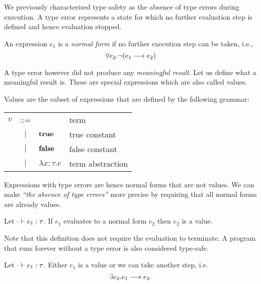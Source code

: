 {We previously characterized type safety as the absence of type errors during
execution. A type error represents a state for which no further evaluation step
is defined and hence evaluation stopped.

\begin{defn}
  An expression $e_1$ is a \emph{normal form} if no further execution step can be
  taken, i.e.,
  \[ \forall e_2. \neg ({e_1} \longrightarrow {e_2}) \]
\end{defn}

A type error however did not produce any \emph{meaningful result}. Let us define
what a meaningful result is. These are special expressions which are also called
values.

\begin{defn}[Value]
  Values are the subset of expressions that are defined by the following
  grammar:
  \begin{center}
    \begin{tabular}{lcll}
      $v$ & ::=    &                    & term             \\
          & $\mid$ & $\textbf{true}$            & true constant    \\
          & $\mid$ & $\textbf{false}$           & false constant   \\
          & $\mid$ & $\lambda x:\tau.e$ & term abstraction \\
    \end{tabular}
  \end{center}
\end{defn}

Expressions with type errors are hence normal forms that are not values. We can
make \emph{``the absence of type errors''} more precise by requiring that all
normal forms are already values.

\begin{thm}
  Let ${\cdot} \vdash {e_1} : {\tau}$. If $e_1$ evaluates to a normal form $e_2$
  then $e_2$ is a value.
\end{thm}

Note that this definition does not require the evaluation to terminate.  A
program that runs forever without a type error is also considered type-safe.


\begin{lem}[Progress]
  Let ${\cdot} \vdash {e_1} : {\tau}$. Either $e_1$ is a value or we can take another
  step, i.e.
  \[ \exists e_2. {e_1} \longrightarrow {e_2}. \]
\end{lem}


}
